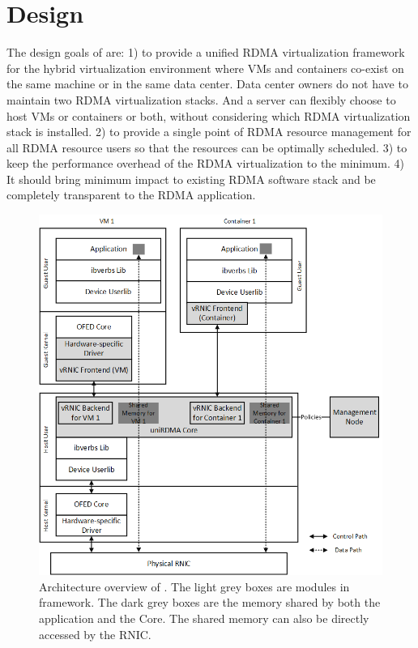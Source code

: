 \section{Design} \label{design}

The design goals of \sys are:
1) to provide a unified RDMA virtualization framework for the hybrid virtualization environment where VMs and containers co-exist on the same machine or in the same data center. Data center owners do not have to maintain two RDMA virtualization stacks. And a server can flexibly choose to host VMs or containers or both, without considering which RDMA virtualization stack is installed.
2) to provide a single point of RDMA resource management for all RDMA resource users so that the resources can be optimally scheduled.
3) to keep the performance overhead of the RDMA virtualization to the minimum.
4) It should bring minimum impact to existing RDMA software stack and be completely transparent to the RDMA application.

\begin{figure}[!ht]
	\centering
	\includegraphics[width=1\linewidth]{images/framework-overview.png}
	\caption{Architecture overview of \sys. The light grey boxes are modules in \sys framework. The dark grey boxes are the memory shared by both the application and the \sys Core. The shared memory can also be directly accessed by the RNIC.}
	\label{fig:framework-overview}
\end{figure}

